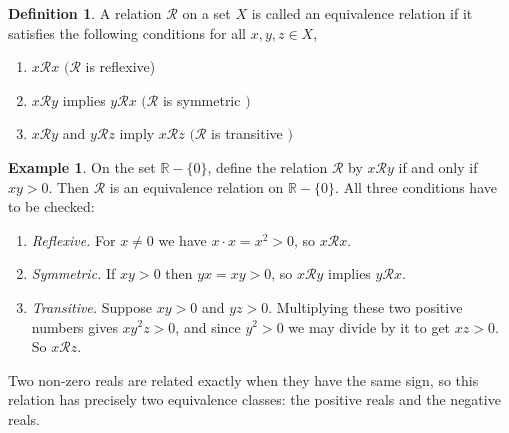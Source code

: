\documentclass[11pt,a4paper]{article}
\theoremstyle{definition}
\newtheorem{defn}[thm]{Definition}
\newtheorem{exa}[thm]{Example}
\begin{document}
\begin{defn}
A relation $\mathcal{R}$ on a set $X$ is called an equivalence relation if it satisfies the following conditions for all $x,y,z\in X$,
\begin{enumerate}
\item[i.] $x\mathcal{R}x$ $(\mathcal{R}$ is reflexive)
\item[ii.] $x\mathcal{R}y$ implies $y\mathcal{R}x$ $(\mathcal{R}$ is symmetric $)$
\item[iii.] $x\mathcal{R}y$ and $y\mathcal{R}z$ imply $x\mathcal{R}z$ $(\mathcal{R}$ is transitive $)$
\end{enumerate}
\end{defn}

\begin{exa}
On the set $\mathbb{R}-\{0\}$, define the relation $\mathcal{R}$ by
$x\mathcal{R}y$ if and only if $xy>0$. Then $\mathcal{R}$ is an equivalence
relation on $\mathbb{R}-\{0\}$. All three conditions have to be checked:
\begin{enumerate}
\item[i.] \emph{Reflexive.} For $x\neq 0$ we have $x\cdot x=x^2>0$, so
      $x\mathcal{R}x$.
\item[ii.] \emph{Symmetric.} If $xy>0$ then $yx=xy>0$, so $x\mathcal{R}y$
      implies $y\mathcal{R}x$.
\item[iii.] \emph{Transitive.} Suppose $xy>0$ and $yz>0$. Multiplying these two
      positive numbers gives $xy^2z>0$, and since $y^2>0$ we may divide by it
      to get $xz>0$. So $x\mathcal{R}z$.
\end{enumerate}
Two non-zero reals are related exactly when they have the same sign, so this
relation has precisely two equivalence classes: the positive reals and the
negative reals.
\end{exa}
\end{document}

